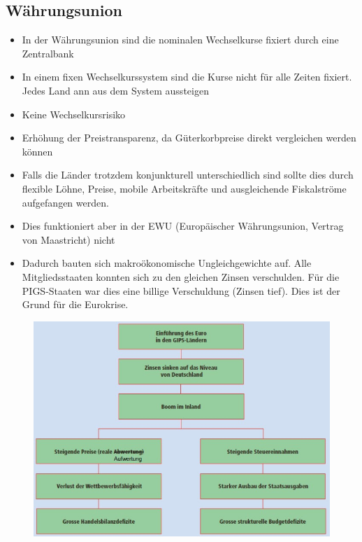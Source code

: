 \subsection{Währungsunion}
\begin{itemize}
	\item In der Währungsunion sind die nominalen Wechselkurse fixiert durch eine Zentralbank
	\item In einem fixen Wechselkurssystem sind die Kurse nicht für alle Zeiten fixiert. Jedes Land ann aus dem System aussteigen
	\item Keine Wechselkursrisiko
	\item Erhöhung der Preistransparenz, da Güterkorbpreise direkt vergleichen werden können
	\item Falls die Länder trotzdem konjunkturell unterschiedlich sind sollte dies durch flexible Löhne, Preise, mobile Arbeitskräfte und ausgleichende Fiskalströme aufgefangen werden. 
	\item Dies funktioniert aber in der EWU (Europäischer Währungsunion, Vertrag von Maastricht) nicht
	\item Dadurch bauten sich makroökonomische Ungleichgewichte auf. Alle Mitgliedsstaaten konnten sich zu den gleichen Zinsen verschulden. Für die PIGS-Staaten war dies eine billige Verschuldung (Zinsen tief). Dies ist der Grund für die Eurokrise.
\end{itemize}
\begin{figure}[h]
\centering
\includegraphics[width=0.8\linewidth]{images/eurokrise.jpg}
\end{figure}
\clearpage
\pagebreak